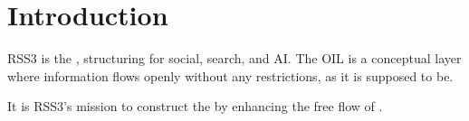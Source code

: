 \section{Introduction} 

RSS3 is the , structuring  for social, search, and AI. The \gls{OIL} is a conceptual layer where information flows openly without any restrictions, as it is supposed to be.

It is RSS3's mission to construct the  by enhancing the free flow of .

